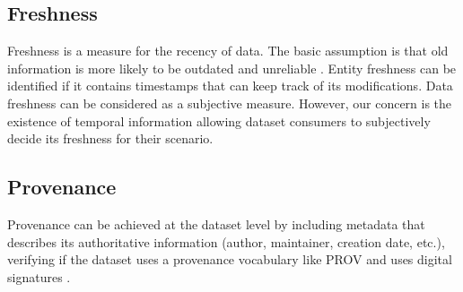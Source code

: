 \documentclass[onecolumn, crcready]{iosart2c}
\begin{document}


\subsection{Freshness}

Freshness is a measure for the recency of data. The basic assumption is that old information is more likely to be outdated and unreliable \cite{Flouris2012}. Entity freshness can be identified if it contains timestamps that can keep track of its modifications. Data freshness can be considered as a subjective measure. However, our concern is the existence of temporal information allowing dataset consumers to subjectively decide its freshness for their scenario.

\subsection{Provenance}

Provenance can be achieved at the dataset level by including metadata that describes its authoritative information (author, maintainer, creation date, etc.), verifying if the dataset uses a provenance vocabulary like PROV \cite{w3c-prov-o} and uses digital signatures \cite{Framework2012}.\\
\end{document}
